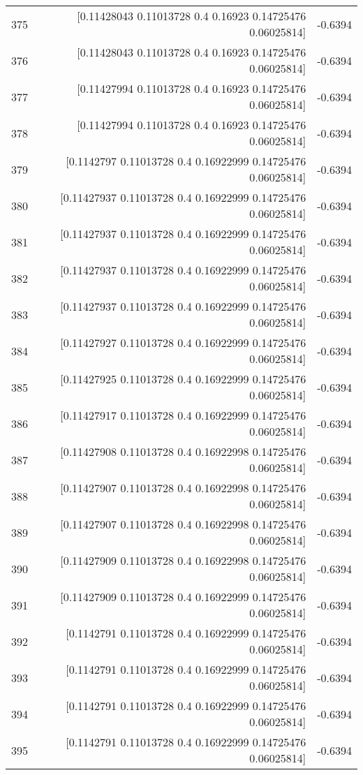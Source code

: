 \begin{longtable}{lrr}
375 & [0.11428043 0.11013728 0.4        0.16923    0.14725476 0.06025814] & -0.6394 \\
376 & [0.11428043 0.11013728 0.4        0.16923    0.14725476 0.06025814] & -0.6394 \\
377 & [0.11427994 0.11013728 0.4        0.16923    0.14725476 0.06025814] & -0.6394 \\
378 & [0.11427994 0.11013728 0.4        0.16923    0.14725476 0.06025814] & -0.6394 \\
379 & [0.1142797  0.11013728 0.4        0.16922999 0.14725476 0.06025814] & -0.6394 \\
380 & [0.11427937 0.11013728 0.4        0.16922999 0.14725476 0.06025814] & -0.6394 \\
381 & [0.11427937 0.11013728 0.4        0.16922999 0.14725476 0.06025814] & -0.6394 \\
382 & [0.11427937 0.11013728 0.4        0.16922999 0.14725476 0.06025814] & -0.6394 \\
383 & [0.11427937 0.11013728 0.4        0.16922999 0.14725476 0.06025814] & -0.6394 \\
384 & [0.11427927 0.11013728 0.4        0.16922999 0.14725476 0.06025814] & -0.6394 \\
385 & [0.11427925 0.11013728 0.4        0.16922999 0.14725476 0.06025814] & -0.6394 \\
386 & [0.11427917 0.11013728 0.4        0.16922999 0.14725476 0.06025814] & -0.6394 \\
387 & [0.11427908 0.11013728 0.4        0.16922998 0.14725476 0.06025814] & -0.6394 \\
388 & [0.11427907 0.11013728 0.4        0.16922998 0.14725476 0.06025814] & -0.6394 \\
389 & [0.11427907 0.11013728 0.4        0.16922998 0.14725476 0.06025814] & -0.6394 \\
390 & [0.11427909 0.11013728 0.4        0.16922998 0.14725476 0.06025814] & -0.6394 \\
391 & [0.11427909 0.11013728 0.4        0.16922999 0.14725476 0.06025814] & -0.6394 \\
392 & [0.1142791  0.11013728 0.4        0.16922999 0.14725476 0.06025814] & -0.6394 \\
393 & [0.1142791  0.11013728 0.4        0.16922999 0.14725476 0.06025814] & -0.6394 \\
394 & [0.1142791  0.11013728 0.4        0.16922999 0.14725476 0.06025814] & -0.6394 \\
395 & [0.1142791  0.11013728 0.4        0.16922999 0.14725476 0.06025814] & -0.6394 \\

\end{longtable}
